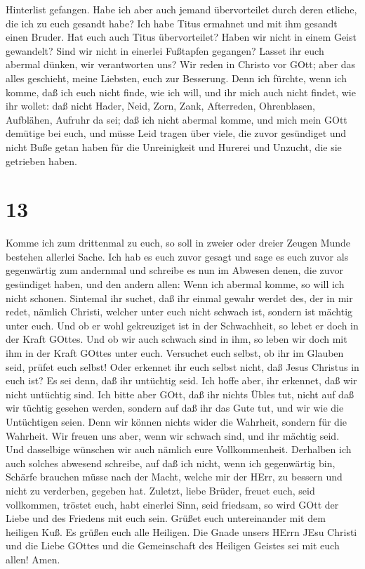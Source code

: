 Hinterlist gefangen.  Habe ich aber auch jemand
übervorteilet durch deren etliche, die ich zu euch gesandt habe?
 Ich habe Titus ermahnet und mit ihm gesandt einen Bruder.
Hat euch auch Titus übervorteilet? Haben wir nicht in einem Geist
gewandelt? Sind wir nicht in einerlei Fußtapfen gegangen? 
Lasset ihr euch abermal dünken, wir verantworten uns? Wir reden in
Christo vor GOtt; aber das alles geschieht, meine Liebsten, euch zur
Besserung.  Denn ich fürchte, wenn ich komme, daß ich euch
nicht finde, wie ich will, und ihr mich auch nicht findet, wie ihr
wollet: daß nicht Hader, Neid, Zorn, Zank, Afterreden, Ohrenblasen,
Aufblähen, Aufruhr da sei;  daß ich nicht abermal komme,
und mich mein GOtt demütige bei euch, und müsse Leid tragen über viele,
die zuvor gesündiget und nicht Buße getan haben für die Unreinigkeit und
Hurerei und Unzucht, die sie getrieben haben.

\hypertarget{section-12}{%
\section{13}\label{section-12}}

 Komme ich zum drittenmal zu euch, so soll in zweier oder
dreier Zeugen Munde bestehen allerlei Sache.  Ich hab es
euch zuvor gesagt und sage es euch zuvor als gegenwärtig zum andernmal
und schreibe es nun im Abwesen denen, die zuvor gesündiget haben, und
den andern allen: Wenn ich abermal komme, so will ich nicht schonen.
 Sintemal ihr suchet, daß ihr einmal gewahr werdet des, der
in mir redet, nämlich Christi, welcher unter euch nicht schwach ist,
sondern ist mächtig unter euch.  Und ob er wohl gekreuziget
ist in der Schwachheit, so lebet er doch in der Kraft GOttes. Und ob wir
auch schwach sind in ihm, so leben wir doch mit ihm in der Kraft GOttes
unter euch.  Versuchet euch selbst, ob ihr im Glauben seid,
prüfet euch selbst! Oder erkennet ihr euch selbst nicht, daß Jesus
Christus in euch ist? Es sei denn, daß ihr untüchtig seid. 
Ich hoffe aber, ihr erkennet, daß wir nicht untüchtig sind. 
Ich bitte aber GOtt, daß ihr nichts Übles tut, nicht auf daß wir tüchtig
gesehen werden, sondern auf daß ihr das Gute tut, und wir wie die
Untüchtigen seien.  Denn wir können nichts wider die
Wahrheit, sondern für die Wahrheit.  Wir freuen uns aber,
wenn wir schwach sind, und ihr mächtig seid. Und dasselbige wünschen wir
auch nämlich eure Vollkommenheit.  Derhalben ich auch
solches abwesend schreibe, auf daß ich nicht, wenn ich gegenwärtig bin,
Schärfe brauchen müsse nach der Macht, welche mir der HErr, zu bessern
und nicht zu verderben, gegeben hat.  Zuletzt, liebe
Brüder, freuet euch, seid vollkommen, tröstet euch, habt einerlei Sinn,
seid friedsam, so wird GOtt der Liebe und des Friedens mit euch sein.
 Grüßet euch untereinander mit dem heiligen Kuß.
 Es grüßen euch alle Heiligen.  Die Gnade
unsers HErrn JEsu Christi und die Liebe GOttes und die Gemeinschaft des
Heiligen Geistes sei mit euch allen! Amen.
